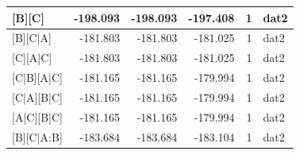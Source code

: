 \documentclass[]{article}
\theoremstyle{definition}
\theoremstyle{definition}
\theoremstyle{definition}
\theoremstyle{remark}
\begin{document}
\begin{table}
\begin{tabular}[t]{l|r|r|r|r|l}
\hline
[A][B][C] & -198.093 & -198.093 & -197.408 & 1 & dat2\\
\hline
[A][B][C|A] & -181.803 & -181.803 & -181.025 & 1 & dat2\\
\hline
[B][C][A|C] & -181.803 & -181.803 & -181.025 & 1 & dat2\\
\hline
[B][C|B][A|C] & -181.165 & -181.165 & -179.994 & 1 & dat2\\
\hline
[A][C|A][B|C] & -181.165 & -181.165 & -179.994 & 1 & dat2\\
\hline
[C][A|C][B|C] & -181.165 & -181.165 & -179.994 & 1 & dat2\\
\hline
[A][B][C|A:B] & -183.684 & -183.684 & -183.104 & 1 & dat2\\
\hline
\end{tabular}
\end{table}
\end{document}
